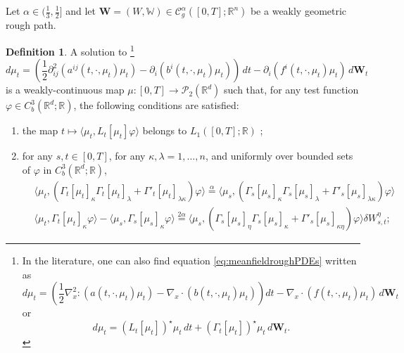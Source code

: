 \documentclass[10pt, a4paper]{article} %
\newcommand{\R}{\mathbb{R}}
\theoremstyle{definition}
\newtheorem{defn}{Definition}[section]
\theoremstyle{plain}
\begin{document}
\noindent Let $\alpha \in (\frac{1}{3},\frac{1}{2}]$ and let $\mathbf{W}=(W,\mathbb{W}) \in \mathscr{C}_g^\alpha([0,T];\R^n)$ be a weakly geometric rough path.
 
\begin{defn} \label{def:solution_meanfieldroughPDE}
    A solution to \footnote{In the literature, one can also find equation \eqref{eq:meanfieldroughPDEs} written as \begin{equation*}
    d\mu_t = \left(\frac{1}{2} \nabla^2_x : (a(t,\cdot,\mu_t) \mu_t) - \nabla_x \cdot (b(t,\cdot,\mu_t) \mu_t)  \right)  dt - \nabla_x \cdot (f(t,\cdot,\mu_t) \mu_t) \, d\mathbf{W}_t 
\end{equation*} or \begin{equation*}
    d\mu_t = (L_t[\mu_t])^\star \mu_t \, dt + (\Gamma_t[\mu_t])^\star \mu_t \, d\mathbf{W}_t .
\end{equation*}} \begin{equation} \label{eq:meanfieldroughPDEs}
        d\mu_t = \left(\frac{1}{2} \partial^2_{ij} (a^{ij}(t,\cdot,\mu_t) \mu_t) -\partial_i (b^i(t,\cdot,\mu_t)\mu_t) \right) \, dt -  \partial_i (f^i(t,\cdot,\mu_t) \mu_t) \, d\mathbf{W}_t
    \end{equation}
    is a weakly-continuous map $\mu : [0,T] \to \mathcal{P}_2(\R^d)$ such that, for any test function $\varphi \in C^3_b(\R^d;\R)$, the following conditions are satisfied: 
    \begin{enumerate} \renewcommand{\labelenumi}{(\roman{enumi})}
        \item the map $t \mapsto \langle \mu_t, L_t[\mu_t] \varphi \rangle$ belongs to $L_1([0,T];\R)$ ; \label{prova}
        \item for any $s,t \in [0,T]$, for any $\kappa,\lambda=1,\dots,n$, and uniformly over bounded sets of $\varphi$ in $C^3_b(\R^d;\R)$,
        \begin{align*}
              &\langle \mu_t, (\Gamma_t[\mu_t]_\kappa \Gamma_t[\mu_t]_\lambda + \Gamma'_t[\mu_t]_{\lambda \kappa} ) \varphi  \rangle \overset{\alpha}{=} \langle \mu_s, (\Gamma_s[\mu_s]_\kappa \Gamma_s[\mu_s]_\lambda + \Gamma'_s[\mu_s]_{\lambda \kappa} ) \varphi  \rangle    \\
              &\langle \mu_t, \Gamma_t[\mu_t]_\kappa \varphi  \rangle - \langle \mu_s, \Gamma_s[\mu_s]_\kappa \varphi  \rangle  \overset{2\alpha}{=} \langle \mu_s, (\Gamma_s[\mu_s]_\eta \Gamma_s[\mu_s]_\kappa + \Gamma'_s[\mu_s]_{\kappa\eta} ) \varphi  \rangle \delta W_{s,t}^\eta ;
        \end{align*}

\end{enumerate}
\end{defn}
\end{document}
